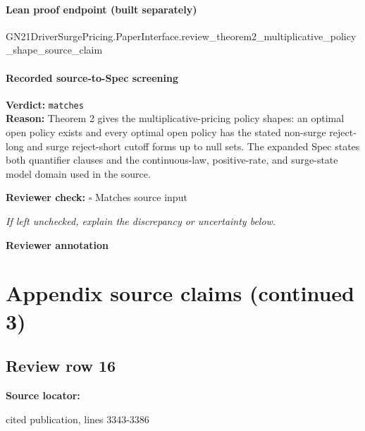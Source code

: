 \documentclass[10pt]{article}
\newcommand{\reviewerbox}{%
  \par\noindent\fbox{\parbox{0.96\linewidth}{\rule{0pt}{0.38in}}}\par
}
\newcommand{\reviewmatch}[1]{%
  \par\noindent\textbf{Reviewer check:} $\square$\; #1\par
  \noindent\emph{If left unchecked, explain the discrepancy or uncertainty below.}\par
}
\begin{document}
\paragraph{Lean proof endpoint (built separately)}\begin{ReviewVerbatim}
GN21DriverSurgePricing.PaperInterface.review_theorem2_multiplicative_policy_shape_source_claim
\end{ReviewVerbatim}

\paragraph{Recorded source-to-Spec screening}
\textbf{Verdict:} \texttt{matches}
\\
\textbf{Reason:} Theorem 2 gives the multiplicative-pricing policy shapes: an optimal open policy exists and every optimal open policy has the stated non-surge reject-long and surge reject-short cutoff forms up to null sets. The expanded Spec states both quantifier clauses and the continuous-law, positive-rate, and surge-state model domain used in the source.
\reviewmatch{Matches source input}
\noindent\textbf{Reviewer annotation}\par
\reviewerbox
\clearpage
\hypertarget{source-claim-5a2021856d51c6f7}{}
\hypertarget{source-section-13054b3f2d04f1de}{}
\section*{Appendix source claims (continued 3)}
\subsection*{Review row 16}
\textbf{Source locator:} {\footnotesize\raggedright cited publication, lines 3343-\allowbreak{}3386\par}
\end{document}
